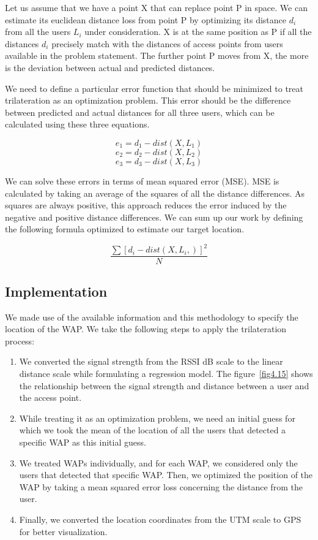 \documentclass[a4paper,singleside,12pt]{report} %
\begin{document}
				Let us assume that we have a point X that can replace point P in space. 
				We can estimate its euclidean distance loss from point P by optimizing its distance $d_i$ from all the users $L_i$ under consideration. 
				X is at the same position as P if all the distances $d_i$ precisely match with the distances of access points from users available in the problem statement. 
				The further point P moves from X, the more is the deviation between actual and predicted distances. 
				
				We need to define a particular error function that should be minimized to treat trilateration as an optimization problem. 
				This error should be the difference between predicted and actual distances for all three users, which can be calculated using these three equations.
				
				 \[e_1 = d_1 - dist\left(X, L_1\right)\]
				 \[e_2= d_2 - dist\left(X, L_2\right)\]
				 \[e_3 = d_3 - dist\left(X, L_3\right)\]
				
				We can solve these errors in terms of mean squared error (MSE). MSE is calculated by taking an average of the squares of all the distance differences. 
				As squares are always positive, this approach reduces the error induced by the negative and positive distance differences.  
				We can sum up our work by defining the following formula optimized to estimate our target location.
				
				\[\frac{\sum { \left[d_i  -dist\left(X,L_i,\right)\right] }^2 }{N}\]


			\subsection{Implementation}

				We made use of the available information and this methodology to specify the location of the WAP. We take the following steps to apply the trilateration process:
				\begin{enumerate}
				\item We converted the signal strength from the RSSI dB scale to the linear distance scale while formulating a regression model. 
				The figure~\ref{fig4.15} shows the relationship between the signal strength and distance between a user and the access point.
				\item While treating it as an optimization problem, we need an initial guess for which we took the mean of the location of all the users that detected a specific WAP as this initial guess.
				\item We treated WAPs individually, and for each WAP, we considered only the users that detected that specific WAP. Then, we optimized the position of the WAP by taking a mean squared error loss concerning the distance from the user.
				\item Finally, we converted the location coordinates from the UTM scale to GPS for better visualization.
				\end{enumerate}
				
\end{document}
